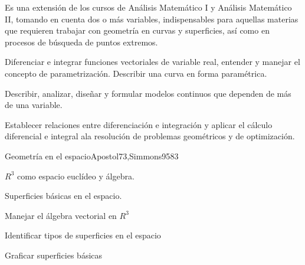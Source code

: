 
\begin{syllabus}


\begin{justification}
Es una extensión de los cursos de Análisis Matemático I y Análisis Matemático II, tomando en cuenta dos o más variables, indispensables para aquellas materias que requieren trabajar con geometría en curvas y superficies, así como en procesos de búsqueda de puntos extremos.
\end{justification}

\begin{goals}
\item Diferenciar e integrar funciones vectoriales de variable real, entender y manejar el concepto de parametrización. Describir una curva en forma paramétrica.
\item Describir, analizar, diseñar y formular modelos continuos que dependen de más de una variable.
\item Establecer relaciones entre diferenciación e integración y aplicar el cálculo diferencial e integral ala resolución de problemas geométricos y de optimización.
\end{goals}

\begin{outcomes}
\end{outcomes}

\begin{unit}{Geometría en el espacio}{Apostol73,Simmons95}{8}{3}
   \begin{topics}
      \item $R^3$ como espacio euclídeo y álgebra.
      \item Superficies básicas en el espacio.
   \end{topics}

   \begin{learningoutcomes}
      \item Manejar el álgebra vectorial en $R^3$
      \item Identificar tipos de superficies en el espacio
      \item Graficar superficies básicas
      \end{learningoutcomes}
\end{unit}


\end{syllabus}
